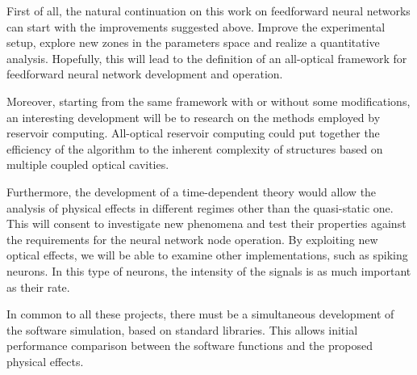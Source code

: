 First of all, the natural continuation on this work on feedforward neural networks can start with the improvements suggested above.
Improve the experimental setup, explore new zones in the parameters space and realize a quantitative analysis.
Hopefully, this will lead to the definition of an all-optical framework for feedforward neural network development and operation.

Moreover, starting from the same framework with or without some modifications, an interesting development will be to research on the methods employed by reservoir computing.
All-optical reservoir computing could put together the efficiency of the algorithm to the inherent complexity of structures based on multiple coupled optical cavities.

Furthermore, the development of a time-dependent theory would allow the analysis of physical effects in different regimes other than the quasi-static one.
This will consent to investigate new phenomena and test their properties against the requirements for the neural network node operation.
By exploiting new optical effects, we will be able to examine other implementations, such as spiking neurons.
In this type of neurons, the intensity of the signals is as much important as their rate.

In common to all these projects, there must be a simultaneous development of the software simulation, based on standard libraries.
This allows initial performance comparison between the software functions and the proposed physical effects.

